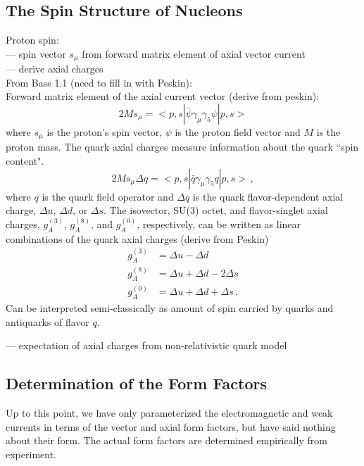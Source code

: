 \subsection{The Spin Structure of Nucleons} \label{sec:nuctheory}
  Proton spin: \\
  --- spin vector $s_{\mu}$ from forward matrix element of axial vector current \\
  --- derive axial charges \\
  From Bass 1.1 (need to fill in with Peskin): \\
  Forward matrix element of the axial current vector (derive from peskin):
  \[
      2Ms_{\mu} = <p,s|\bar{\psi}\gamma_{\mu} \gamma_{5} \psi|p,s>
  \]
  where $s_{\mu}$ is the proton's spin vector, $\psi$ is the proton field
  vector and $M$ is the proton mass. The quark axial charges measure
  information about the quark ``spin content".
  \[
    2Ms_{\mu}\Delta q = <p,s| \bar{q}\gamma_{\mu}\gamma_{5}q|p,s> \,,
  \]
  where $q$ is the quark field operator and $\Delta q$ is the quark
  flavor-dependent axial charge, $\Delta u$, $\Delta d$, or $\Delta s$. The
  isovector, SU(3) octet, and flavor-singlet axial charges, $g_A^{(3)}$,
  $g_A^{(8)}$, and $g_A^{(0)}$, respectively, can be written as linear
  combinations of the quark axial charges (derive from Peskin)
  \begin{align}
      g_A^{(3)} &= \Delta u - \Delta d \\
      g_A^{(8)} &= \Delta u + \Delta d - 2\Delta s \\
      g_A^{(0)} &= \Delta u + \Delta d + \Delta s \,.
  \end{align}
  Can be interpreted semi-classically as amount of spin carried by quarks and
  antiquarks of flavor $q$.

  --- expectation of axial charges from non-relativistic quark model

\subsection{Determination of the Form Factors} \label{formfactorforms}

  Up to this point, we have only parameterized the electromagnetic and weak
  currents in terms of the vector and axial form factors, but have said nothing
  about their form. The actual form factors are determined empirically from
  experiment.


